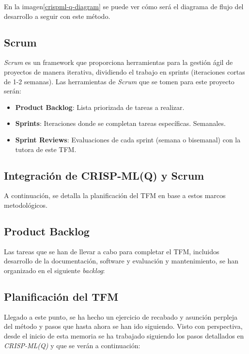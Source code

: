 En la imagen\ref{crispml-q-diagram} se puede ver cómo será el diagrama de flujo del desarrollo a seguir con este método.

\subsection{Scrum}

\emph{Scrum} es un framework que proporciona herramientas para la gestión ágil de proyectos de manera iterativa, dividiendo el trabajo en sprints (iteraciones cortas de 1-2 semanas). Las herramientas de \emph{Scrum} que se tomen para este proyecto serán:

\begin{itemize}
    \item \textbf{Product Backlog}: Lista priorizada de tareas a realizar.
    \item \textbf{Sprints}: Iteraciones donde se completan tareas específicas. Semanales.
    \item \textbf{Sprint Reviews}: Evaluaciones de cada sprint (semana o bisemanal) con la tutora de este TFM.
\end{itemize}

\subsection{Integración de CRISP-ML(Q) y Scrum}

A continuación, se detalla la planificación del TFM en base a estos marcos metodológicos.

\subsection{Product Backlog}

Las tareas que se han de llevar a cabo para completar el TFM, incluidos desarrollo de la documentación, software y evaluación y mantenimiento, se han organizado en el siguiente \emph{backlog}:



\clearpage

\clearpage

\newpage

%


\subsection{Planificación del TFM}

Llegado a este punto, se ha hecho un ejercicio de recabado y asunción perpleja del método y pasos que hasta ahora se han ido siguiendo. Visto con perspectiva, desde el inicio de esta memoria se ha trabajado siguiendo los pasos detallados en \emph{CRISP-ML(Q)} y que se verán a continuación:

